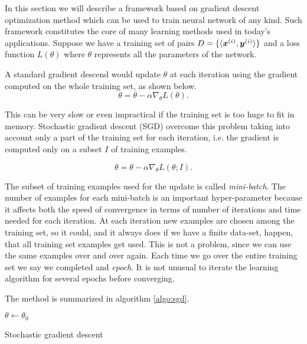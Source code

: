 \label{sec:sgd}
In this section we will describe a framework based on gradient descent optimization method which can be used to train 
neural network of any kind. Such framework constitutes the core of many learning methods used in today's applications. 
Suppose we have a training set of pairs $D=\{\langle\boldsymbol{x}^{(i)},\boldsymbol{y}^{(i)}\rangle\}$ and a loss function $L(\theta)$ 
where $\theta$ represents all the parameters of the network.

A standard gradient descend would update $\theta$ at each iteration using the gradient computed on the whole training 
set, as shown below.
\begin{equation}
 \theta = \theta - \alpha \nabla_\theta L(\theta).
\end{equation}

This can be very slow or even impractical if the training set is too huge to fit in memory. Stochastic gradient descent (SGD)
overcome this problem taking into account only a part of the training set for each iteration, i.e. the gradient is computed only on a subset $I$ of training examples. 

\begin{equation}
 \theta = \theta - \alpha \nabla_\theta L(\theta; I)
 \label{eq:updateRule}.
\end{equation}

The subset of training examples used for the update is called \textit{mini-batch}. The number of examples for each 
mini-batch is an important hyper-parameter because it affects both the speed of convergence in terms of number of 
iterations and time needed for each iteration. At each iteration new examples are chosen among the training set, so it could, and it always does if we have a finite data-set, happen, that all training set examples get used.
This is not a problem, since we can use the same examples over and over again. Each time we go over the entire training 
set we say we completed and \textit{epoch}. It is not unusual to iterate the learning algorithm for several epochs before converging.

The method is summarized in algorithm \ref{algo:sgd}.

\begin{algorithm}[]
  
 \BlankLine
 
 $\theta \gets \theta_0$\\
\caption{Stochastic gradient descent}
\label{algo:sgd}
\end{algorithm}

